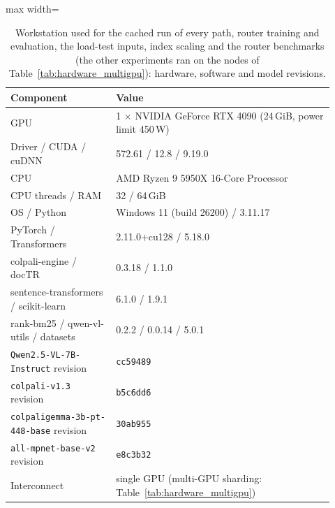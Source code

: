 \begin{table}[t]
\centering
\caption{Workstation used for the cached run of every path, router training and evaluation, the load-test inputs, index scaling and the router benchmarks (the other experiments ran on the nodes of Table~\ref{tab:hardware_multigpu}): hardware, software and model revisions.}
\label{tab:hardware}
\begin{adjustbox}{max width=\linewidth}
\begin{tabular}{p{0.3\linewidth}p{0.62\linewidth}}
\toprule
\textbf{Component} & \textbf{Value} \\
\midrule
GPU & 1 $\times$ NVIDIA GeForce RTX 4090 (24\,GiB, power limit 450\,W) \\
Driver / CUDA / cuDNN & 572.61 / 12.8 / 9.19.0 \\
CPU & AMD Ryzen 9 5950X 16-Core Processor \\
CPU threads / RAM & 32 / 64\,GiB \\
OS / Python & Windows 11 (build 26200) / 3.11.17 \\
PyTorch / Transformers & 2.11.0+cu128 / 5.18.0 \\
colpali-engine / docTR & 0.3.18 / 1.1.0 \\
sentence-transformers / scikit-learn & 6.1.0 / 1.9.1 \\
rank-bm25 / qwen-vl-utils / datasets & 0.2.2 / 0.0.14 / 5.0.1 \\
\texttt{Qwen2.5-\allowbreak{}VL-\allowbreak{}7B-\allowbreak{}Instruct} revision & \texttt{cc59489} \\
\texttt{colpali-\allowbreak{}v1.3} revision & \texttt{b5c6dd6} \\
\texttt{colpaligemma-\allowbreak{}3b-\allowbreak{}pt-\allowbreak{}448-\allowbreak{}base} revision & \texttt{30ab955} \\
\texttt{all-\allowbreak{}mpnet-\allowbreak{}base-\allowbreak{}v2} revision & \texttt{e8c3b32} \\
Interconnect & single GPU (multi-GPU sharding: Table~\ref{tab:hardware_multigpu}) \\
\bottomrule
\end{tabular}
\end{adjustbox}
\end{table}
